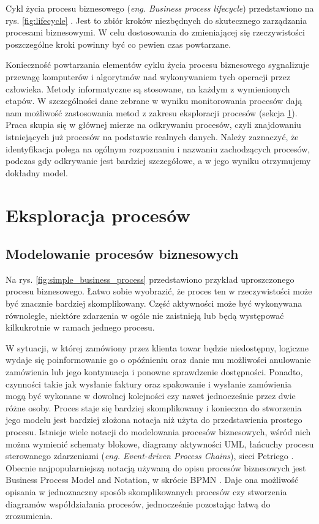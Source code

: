 Cykl życia procesu biznesowego (\textit{eng. Business process lifecycle}) przedstawiono na rys. \ref{fig:lifecycle} \cite{dumas2013fundamentals}. Jest to zbiór kroków niezbędnych do skutecznego zarządzania procesami biznesowymi. W celu dostosowania do zmieniającej się rzeczywistości poszczególne kroki powinny być co pewien czas powtarzane. 

Konieczność powtarzania elementów cyklu życia procesu biznesowego sygnalizuje przewagę komputerów i algorytmów nad wykonywaniem tych operacji przez człowieka. Metody informatyczne są stosowane, na każdym z wymienionych etapów. W szczególności dane zebrane w wyniku monitorowania procesów dają nam możliwość zastosowania metod z zakresu eksploracji procesów (sekcja \ref{sec:eksploracja}). Praca skupia się w głównej mierze na odkrywaniu procesów, czyli znajdowaniu istniejących już procesów na podstawie realnych danych. Należy zaznaczyć, że identyfikacja polega na ogólnym rozpoznaniu i nazwaniu zachodzących procesów, podczas gdy odkrywanie jest bardziej szczegółowe, a w jego wyniku otrzymujemy dokładny model.  


\section{Eksploracja procesów}
\label{sec:eksploracja}
\subsection{Modelowanie procesów biznesowych}
\label{sec:modelling}
Na rys. \ref{fig:simple_business_process} przedstawiono przykład uproszczonego procesu biznesowego. Łatwo sobie wyobrazić, że proces ten w rzeczywistości może być znacznie bardziej skomplikowany. Część aktywności może być wykonywana równolegle, niektóre zdarzenia w ogóle nie zaistnieją lub będą występować kilkukrotnie w ramach jednego procesu. 

W sytuacji, w której zamówiony przez klienta towar będzie niedostępny, logiczne wydaje się poinformowanie go o opóźnieniu oraz danie mu możliwości anulowanie zamówienia lub jego kontynuacja i ponowne sprawdzenie dostępności. Ponadto, czynności takie jak wysłanie faktury oraz spakowanie i wysłanie zamówienia mogą być wykonane w dowolnej kolejności czy nawet jednocześnie przez dwie różne osoby. Proces staje się bardziej skomplikowany i konieczna do stworzenia jego modelu jest bardziej złożona notacja niż użyta do przedstawienia prostego procesu. 
Istnieje wiele notacji do modelowania procesów biznesowych, wśród nich można wymienić schematy blokowe, diagramy aktywności UML, łańcuchy procesu sterowanego zdarzeniami (\textit{eng. Event-driven Process Chains}), sieci Petriego \cite{BPMComparission}. Obecnie najpopularniejszą notacją używaną do opisu procesów biznesowych jest Business Process  Model and Notation, w skrócie BPMN \cite{omg2011bpmn}. Daje ona możliwość opisania w jednoznaczny sposób skomplikowanych procesów czy stworzenia diagramów współdziałania procesów, jednocześnie pozostając łatwą do zrozumienia.

